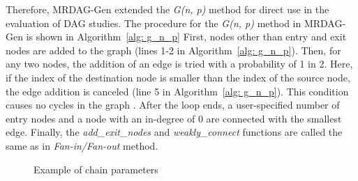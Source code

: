 Therefore, MRDAG-Gen extended the {\it G(n, p)} method for direct use in the evaluation of DAG studies.
The procedure for the {\it G(n, p)} method in MRDAG-Gen is shown in Algorithm~\ref{alg: g_n_p}
First, nodes other than entry and exit nodes are added to the graph (lines 1-2 in Algorithm~\ref{alg: g_n_p}).
Then, for any two nodes, the addition of an edge is tried with a probability of 1 in 2.
Here, if the index of the destination node is smaller than the index of the source node, the edge addition is canceled (line 5 in Algorithm~\ref{alg: g_n_p}).
This condition causes no cycles in the graph \cite{voronov2021ai, agrawal2020hard}.
After the loop ends, a user-specified number of entry nodes and a node with an in-degree of 0 are connected with the smallest edge.
Finally, the {\it add\_exit\_nodes} and {\it weakly\_connect} functions are called the same as in {\it Fan-in/Fan-out} method.


\begin{figure}[tb]
    \centering
    \caption{Example of chain parameters}
    \label{fig: chain_param_exam}
\end{figure}


